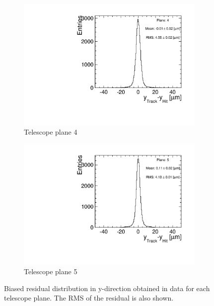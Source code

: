 \begin{figure}[htbp]
\begin{subfigure}[b]{0.3\textwidth}
    \includegraphics[width=\textwidth]{figures/Telescope/biasedResiduals/BiasedResiduals_run661_PlaneYRMS4.pdf}
    \caption{Telescope  plane 4}
  \end{subfigure}\hfill
  \begin{subfigure}[b]{0.3\textwidth}
    \includegraphics[width=\textwidth]{figures/Telescope/biasedResiduals/BiasedResiduals_run661_PlaneYRMS5.pdf}
    \caption{Telescope  plane 5}
  \end{subfigure}
  \caption{Biased residual distribution in y-direction obtained in
    data for each telescope plane. The RMS of the residual is also
    shown.}
  \label{fig:telescope_biasedResiduals_data_Y}
\end{figure}


